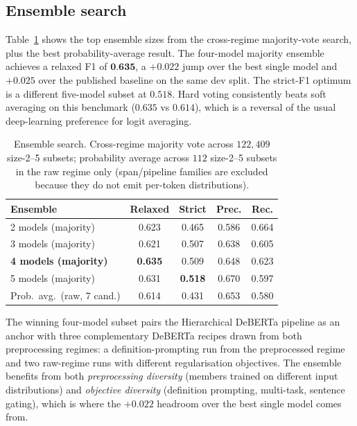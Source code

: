 \documentclass[11pt]{article}
\begin{document}
\subsection{Ensemble search}

Table~\ref{tab:ensemble} shows the top ensemble sizes from the cross-regime majority-vote search, plus the best probability-average result. The four-model majority ensemble achieves a relaxed F1 of $\textbf{0.635}$, a $+0.022$ jump over the best single model and $+0.025$ over the published baseline on the same dev split. The strict-F1 optimum is a different five-model subset at $0.518$. Hard voting consistently beats soft averaging on this benchmark ($0.635$ vs $0.614$), which is a reversal of the usual deep-learning preference for logit averaging.

\begin{table}[t]
\centering\scriptsize
\setlength{\tabcolsep}{4pt}
\begin{tabular}{lcccc}
\toprule
Ensemble & Relaxed & Strict & Prec. & Rec. \\
\midrule
2 models (majority)              & 0.623 & 0.465 & 0.586 & 0.664 \\
3 models (majority)              & 0.621 & 0.507 & 0.638 & 0.605 \\
\textbf{4 models (majority)}     & \textbf{0.635} & 0.509 & 0.648 & 0.623 \\
5 models (majority)              & 0.631 & \textbf{0.518} & 0.670 & 0.597 \\
\midrule
Prob.\ avg.\ (raw, 7 cand.)      & 0.614 & 0.431 & 0.653 & 0.580 \\
\bottomrule
\end{tabular}
\caption{Ensemble search. Cross-regime majority vote across $122{,}409$
size-2--5 subsets; probability average across $112$ size-2--5 subsets in the raw regime only (span/pipeline families are excluded because they
do not emit per-token distributions).}
\label{tab:ensemble}
\end{table}

The winning four-model subset pairs the Hierarchical DeBERTa pipeline
as an anchor with three complementary DeBERTa recipes drawn from both
preprocessing regimes: a definition-prompting run from the
preprocessed regime and two raw-regime runs with different
regularisation objectives. The ensemble benefits from both
\emph{preprocessing diversity} (members trained on different input
distributions) and \emph{objective diversity} (definition prompting,
multi-task, sentence gating), which is where the $+0.022$ headroom over the best single model comes from.
\end{document}
